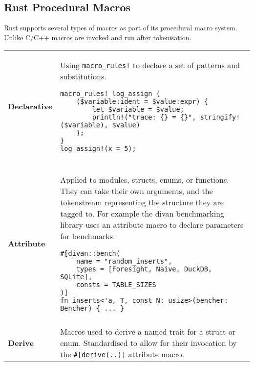 \subsection{Rust Procedural Macros}
Rust supports several types of macros as part of its procedural macro system. Unlike C/C++ macros are invoked and run after tokenisation.
\\ \begin{longtable}{l p{}}
    \textbf{Declarative} & {
            Using \texttt{macro_rules!} to declare a set
            of patterns and substitutions.
            \begin{verbatim}
macro_rules! log_assign {
    ($variable:ident = $value:expr) {
        let $variable = $value;
        println!("trace: {} = {}", stringify!($variable), $value)
    };
}
log_assign!(x = 5);
        \end{verbatim}
    }                                                                                                                                                                                                  \\                                                                                                                                                                                                 \\
    \textbf{Attribute}   & {
            Applied to modules, structs, enums, or functions. They can take their
            own arguments, and the tokenstream representing the structure they are tagged to.
            \newline
            \newline For example the divan benchmarking library uses an attribute macro to declare parameters for benchmarks.
            \begin{verbatim}
#[divan::bench(
    name = "random_inserts",
    types = [Foresight, Naive, DuckDB, SQLite],
    consts = TABLE_SIZES
)]
fn inserts<'a, T, const N: usize>(bencher: Bencher) { ... }
        \end{verbatim}
    }                                                                                                                                                                                                  \\
    \\
    \textbf{Derive}      & {
    Macros used to derive a named trait for a struct or enum. Standardised to allow for their invocation by the \texttt{#[derive(..)]} attribute macro.
}
\end{longtable}
